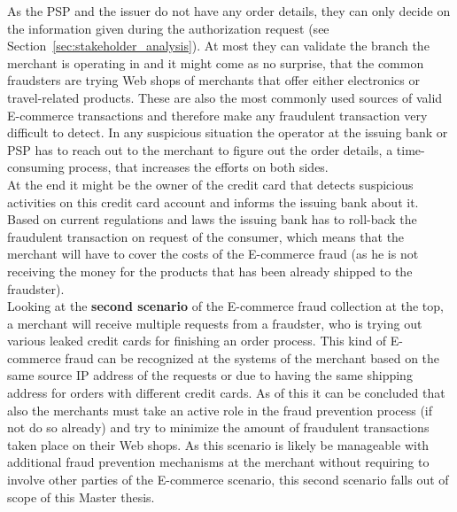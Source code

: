 As the \gls{PSP} and the issuer do not have any order details, they can only decide on the information given during the authorization request (see Section~\ref{sec:stakeholder_analysis}). At most they can validate the branch the merchant is operating in and it might come as no surprise, that the common fraudsters are trying Web shops of merchants that offer either electronics or travel-related products. These are also the most commonly used sources of valid E-commerce transactions and therefore make any fraudulent transaction very difficult to detect. In any suspicious situation the operator at the issuing bank or \gls{PSP} has to reach out to the merchant to figure out the order details, a time-consuming process, that increases the efforts on both sides. \\

At the end it might be the owner of the credit card that detects suspicious activities on this credit card account and informs the issuing bank about it. Based on current regulations and laws the issuing bank has to roll-back the fraudulent transaction on request of the consumer, which means that the merchant will have to cover the costs of the E-commerce fraud (as he is not receiving the money for the products that has been already shipped to the fraudster). \\

Looking at the \textbf{second scenario} of the E-commerce fraud collection at the top, a merchant will receive multiple requests from a fraudster, who is trying out various leaked credit cards for finishing an order process. This kind of E-commerce fraud can be recognized at the systems of the merchant based on the same source \gls{IP} address of the requests or due to having the same shipping address for orders with different credit cards. As of this it can be concluded that also the merchants must take an active role in the fraud prevention process (if not do so already) and try to minimize the amount of fraudulent transactions taken place on their Web shops. As this scenario is likely be manageable with additional fraud prevention mechanisms at the merchant without requiring to involve other parties of the E-commerce scenario, this second scenario falls out of scope of this Master thesis. 


